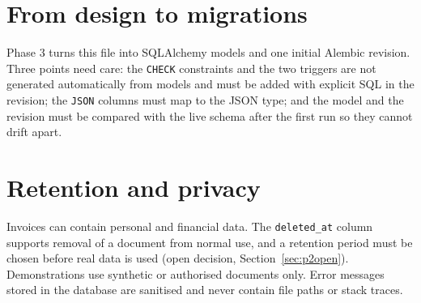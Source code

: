 \section{From design to migrations}
Phase 3 turns this file into SQLAlchemy models and one initial Alembic revision. Three points need care: the \texttt{CHECK} constraints and the two triggers are not generated automatically from models and must be added with explicit SQL in the revision; the \texttt{JSON} columns must map to the JSON type; and the model and the revision must be compared with the live schema after the first run so they cannot drift apart.

\section{Retention and privacy}
Invoices can contain personal and financial data. The \texttt{deleted\_at} column supports removal of a document from normal use, and a retention period must be chosen before real data is used (open decision, Section~\ref{sec:p2open}). Demonstrations use synthetic or authorised documents only. Error messages stored in the database are sanitised and never contain file paths or stack traces.
